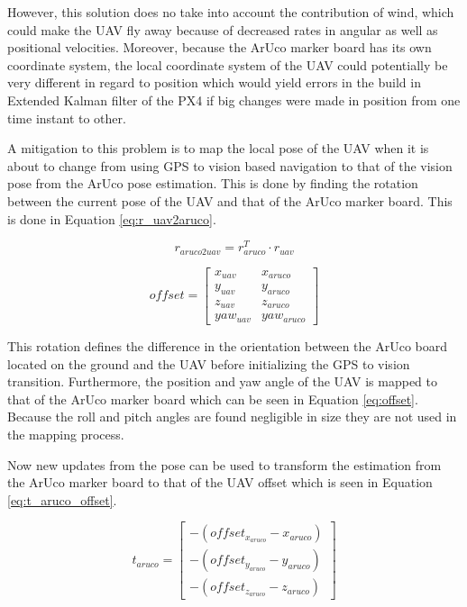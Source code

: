 \documentclass[../Head/report.tex]{subfiles}
\begin{document}
However, this  solution does no take into account the contribution of wind, which could make the UAV fly away because of decreased rates in angular as well as positional velocities. Moreover, because the ArUco marker board has its own coordinate system, the local coordinate system of the UAV could potentially be very different in regard to position which would yield errors in the build in Extended Kalman filter of the PX4 if big changes were made in position from one time instant to other.    

A mitigation to this problem is to map the local pose of the UAV when it is about to change from using GPS to vision based navigation to that of the vision pose from the ArUco pose estimation. This is done by finding the rotation between the current pose of the UAV and that of the ArUco marker board. This is done in Equation \ref{eq:r_uav2aruco}.

\begin{equation}
	r_{aruco2uav} = r_{aruco}^T \cdot r_{uav}
	\label{eq:r_uav2aruco}
\end{equation}

\begin{equation}
	offset = \begin{bmatrix}
						  x_{uav} & x_{aruco}\\
						  y_{uav} & y_{aruco}\\
						  z_{uav} & z_{aruco}\\
						  yaw_{uav} & yaw_{aruco}
					     \end{bmatrix}
\label{eq:offset}
\end{equation}

This rotation defines the difference in the orientation between the ArUco board located on the ground and the UAV before initializing the GPS to vision transition. Furthermore, the position and yaw angle of the UAV is mapped to that of the ArUco marker board which can be seen in Equation \ref{eq:offset}. Because the roll and pitch angles are found negligible in size they are not used in the mapping process. 

Now new updates from the pose can be used to transform the estimation from the ArUco marker board to that of the UAV offset which is seen in Equation \ref{eq:t_aruco_offset}.     

\begin{equation}
	t_{aruco} = \begin{bmatrix}
			   -(offset_{x_{aruco}} - x_{aruco})\\
			   -(offset_{y_{aruco}} - y_{aruco})\\
			   -(offset_{z_{aruco}} - z_{aruco})
			   \end{bmatrix}
\label{eq:t_aruco_offset}
\end{equation}
\end{document}

